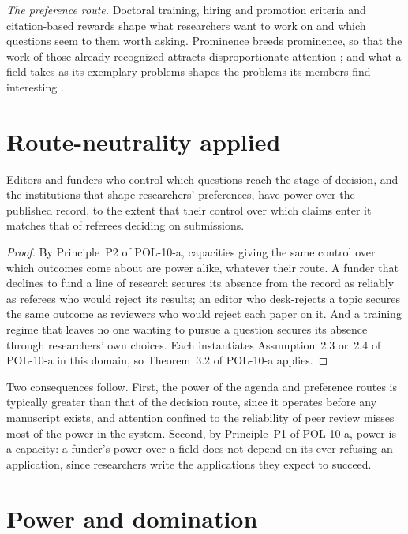 \documentclass{situationist-preprint}
\begin{document}
\emph{The preference route.} Doctoral training, hiring and promotion criteria and citation-based rewards shape what researchers want to work on and which questions seem to them worth asking. Prominence breeds prominence, so that the work of those already recognized attracts disproportionate attention \citep{Merton1968}; and what a field takes as its exemplary problems shapes the problems its members find interesting \citep{Kuhn1962}.

\section{Route-neutrality applied}

\begin{proposition}\label{p:power}
Editors and funders who control which questions reach the stage of decision, and the institutions that shape researchers' preferences, have power over the published record, to the extent that their control over which claims enter it matches that of referees deciding on submissions.
\end{proposition}

\begin{proof}
By Principle~P2 of POL-10-a, capacities giving the same control over which outcomes come about are power alike, whatever their route. A funder that declines to fund a line of research secures its absence from the record as reliably as referees who would reject its results; an editor who desk-rejects a topic secures the same outcome as reviewers who would reject each paper on it. And a training regime that leaves no one wanting to pursue a question secures its absence through researchers' own choices. Each instantiates Assumption~2.3 or~2.4 of POL-10-a in this domain, so Theorem~3.2 of POL-10-a applies.
\end{proof}

Two consequences follow. First, the power of the agenda and preference routes is typically greater than that of the decision route, since it operates before any manuscript exists, and attention confined to the reliability of peer review misses most of the power in the system. Second, by Principle~P1 of POL-10-a, power is a capacity: a funder's power over a field does not depend on its ever refusing an application, since researchers write the applications they expect to succeed.

\section{Power and domination}
\end{document}
